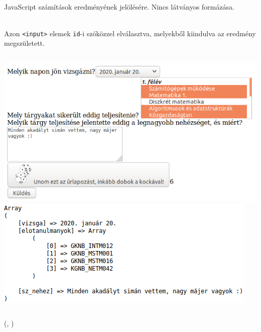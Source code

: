 \begin{frame}
  \begin{description}[m]
    \item[\texttt{<output>}] \hfill \\ JavaScript számítások 
    eredményének jelölésére. Nincs látványos formázása.
    \begin{description}[m]
      \item[\texttt{for}] \hfill \\ Azon \texttt{<input>} elemek 
      \texttt{id}-i szóközzel elválasztva, melyekből kiindulva az eredmény 
      megszületett.
    \end{description}
  \end{description}
  \begin{columns}[T]
      \includegraphics[width=\textwidth]{urlap7-1.png}
      \includegraphics[width=\textwidth]{urlap7-2.png}
  \end{columns}
\end{frame}

\begin{frame}
  \begin{exampleblock}{ 
  (, )}
    \footnotesize
    
  \end{exampleblock}
\end{frame}


